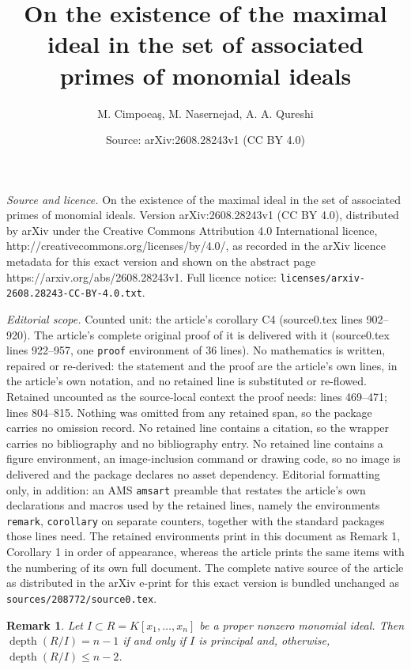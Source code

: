 \documentclass[10pt,a4paper]{amsart}
\title{On the existence of the maximal ideal in the set of associated primes of monomial ideals}
\author{M. Cimpoea\c{s}, M. Nasernejad, A. A. Qureshi}
\date{Source: arXiv:2608.28243v1 (CC BY 4.0)}
\newtheorem{remark}{Remark}
\def\depth{\operatorname{depth}}
\begin{document}
\maketitle

\noindent\emph{Source and licence.} On the existence of the maximal ideal in the set of associated primes of monomial ideals. Version arXiv:2608.28243v1 (CC BY 4.0), distributed by arXiv under the Creative Commons Attribution 4.0 International licence, http://creativecommons.org/licenses/by/4.0/, as recorded in the arXiv licence metadata for this exact version and shown on the abstract page https://arxiv.org/abs/2608.28243v1. Full licence notice: \texttt{licenses/arxiv-2608.28243-CC-BY-4.0.txt}.\par\smallskip

\noindent\textit{Editorial scope.} Counted unit: the article's corollary C4 (source0.tex lines 902--920). The article's complete original proof of it is delivered with it (source0.tex lines 922--957, one \texttt{proof} environment of 36 lines). No mathematics is written, repaired or re-derived: the statement and the proof are the article's own lines, in the article's own notation, and no retained line is substituted or re-flowed.  Retained uncounted as the source-local context the proof needs: lines 469--471; lines 804--815.  Nothing was omitted from any retained span, so the package carries no omission record.  No retained line contains a citation, so the wrapper carries no bibliography and no bibliography entry.  No retained line contains a figure environment, an image-inclusion command or drawing code, so no image is delivered and the package declares no asset dependency.  Editorial formatting only, in addition: an AMS \texttt{amsart} preamble that restates the article's own declarations and macros used by the retained lines, namely the environments \texttt{remark}, \texttt{corollary} on separate counters, together with the standard packages those lines need.  The retained environments print in this document as Remark 1, Corollary 1 in order of appearance, whereas the article prints the same items with the numbering of its own full document.  The complete native source of the article as distributed in the arXiv e-print for this exact version is bundled unchanged as \texttt{sources/208772/source0.tex}.
\begin{remark}\label{rem1}
Let $I\subset R=K[x_1,\ldots,x_n]$ be a proper  nonzero  monomial ideal. Then $\depth(R/I)=n-1$ if and only if $I$ is principal and, otherwise, $\depth(R/I)\leq n-2$.
\end{remark}
\end{document}
